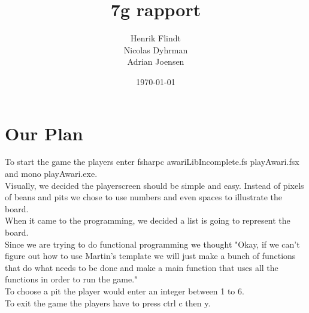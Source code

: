 \documentclass{article}
\title{7g rapport}
\author{Henrik Flindt\\Nicolas Dyhrman\\Adrian Joensen}
\date{\today}
\begin{document}
    \maketitle
    \section{Our Plan}
        To start the game the players enter fsharpc awariLibIncomplete.fs playAwari.fsx and mono playAwari.exe.
        \\
        Visually, we decided the playerscreen should be simple and easy. Instead of pixels of beans and pits we chose to use numbers and even spaces to illustrate the board.
        \\
        When it came to the programming, we decided a list is going to represent the board.
        \\
        Since we are trying to do functional programming we thought "Okay, if we can't figure out how to use Martin's template we will just make a bunch of functions that do what needs to be done and make a main function that uses all the functions in order to run the game."
        \\
        To choose a pit the player would enter an integer between 1 to 6.
        \\
        To exit the game the players have to press ctrl c then y.
\end{document}
